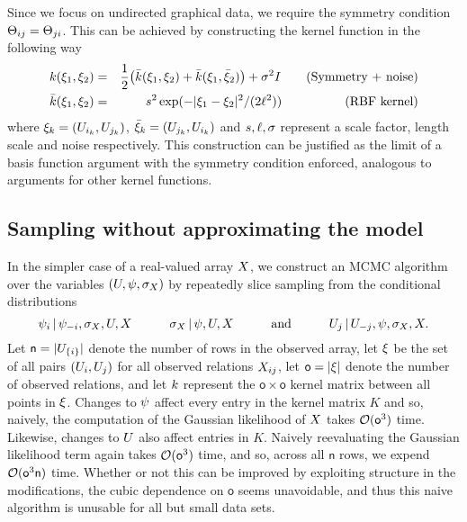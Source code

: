 Since we focus on undirected graphical data, we require the symmetry condition $\Theta_{ij} = \Theta_{ji}$. This can be achieved by constructing the kernel function in the following way
\begin{eqnarray}
k(\xi_1, \xi_2) & = & \frac{1}{2}\big(\bar{k}(\xi_1, \xi_2) + \bar{k}(\xi_1, \bar{\xi}_2)\big) + \sigma^2I \quad \quad \textrm{(Symmetry + noise)} \\
\bar{k}(\xi_1, \xi_2) & = & s^2\exp(-|\xi_1 - \xi_2|^2/(2\ell^2)) \quad \quad \quad \quad \quad \textrm{(RBF kernel)}
\end{eqnarray}
where $\xi_k = (U_{i_k}, U_{j_k})$, $\bar{\xi}_k= (U_{j_k}, U_{i_k})$ and $s, \ell, \sigma$ represent a scale factor, length scale and noise respectively. This construction can be justified as the limit of a basis function argument with the symmetry condition enforced, analogous to arguments for other kernel functions.


\subsection{Sampling without approximating the model}

\newcommand{\numobs}{\mathsf o}
\newcommand{\numnodes}{\mathsf n}
In the simpler case of a real-valued array $X$, we construct an MCMC algorithm over the variables $(U,\psi, \sigma_X)$ by repeatedly slice sampling \citep{MR1994729} from the conditional distributions
\[
\psi_i \,|\, \psi_{-i}, \sigma_X, U, X
\qquad\quad
\sigma_X \,|\, \psi, U, X
\qquad\quad \text{and} \qquad\quad
U_j \,|\, U_{-j}, \psi, \sigma_X, X.
\]
Let $\numnodes = |\AHvar_{\lbrace i\rbrace}|$ denote the number of rows in the observed array,
let $\xi$ be the set of all pairs $(U_i,U_j)$ for all observed relations $X_{ij}$, 
let $\numobs = |\inputpoints|$ denote the number of observed relations,
and 
let $k$ represent the $\numobs \times \numobs$ kernel matrix between all points in $\xi$. Changes to $\psi$ affect every entry in the kernel matrix $K$ and so, naively, the computation of the Gaussian likelihood of $X$ takes $\CompOrder(\numobs^3)$ time.  Likewise, changes to $U$ also affect entries in $K$. Naively reevaluating the Gaussian likelihood term again takes $\CompOrder(\numobs^3)$ time, and so, across all $\numnodes$ rows, we expend $\CompOrder(\numobs^3 \numnodes)$ time. Whether or not this can be improved by exploiting structure in the modifications, the cubic dependence on $\numobs$ seems unavoidable, and thus this naive algorithm is unusable for all but small data sets. 


